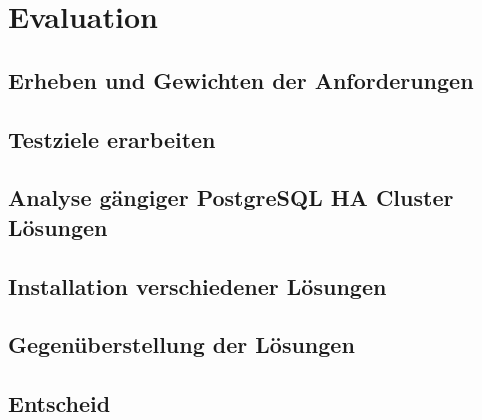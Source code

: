 
\section{Evaluation}
\subsection{Erheben und Gewichten der Anforderungen}
\subsection{Testziele erarbeiten}
\subsection{Analyse gängiger PostgreSQL HA Cluster Lösungen}
\subsection{Installation verschiedener Lösungen}
\subsection{Gegenüberstellung der Lösungen}
\subsection{Entscheid}